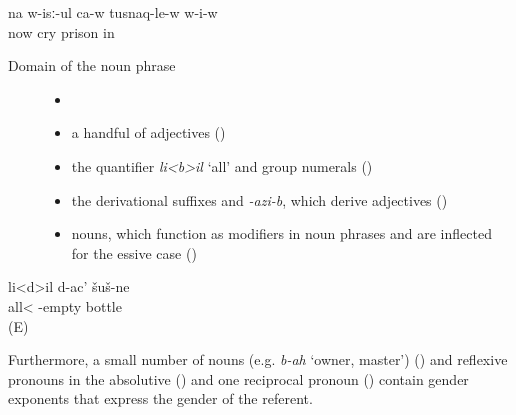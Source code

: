 \begin{exe}
	\ex	\label{ex:‎Now he is crying in prisonAGREE}
	\gll	na	w-isː-ul	ca-w	tusnaq-le-w	w-i-w\\
		now	cry		prison	in\\
	\glt	{}
\end{exe}


\begin{description}
\item[Domain of the noun phrase]
\begin{itemize}[leftmargin=*]
    \item[]
    \item	a handful of adjectives ()
	\item	the quantifier \textit{li<b>il} ‘all' and group numerals ()
	\item	the derivational suffixes  and \textit{-azi-b}, which derive adjectives ()
	\item	nouns, which function as modifiers in noun phrases and are inflected for the essive case ()
\end{itemize}
\end{description}


\begin{exe}
	\ex	\label{ex:All empty bottlesAGREE}
	\gll	li<d>il d-ac' šuš-ne\\
		all<\tsc{npl} 	-empty	bottle\\
	\glt	{} (E)
\end{exe}



Furthermore, a small number of nouns (e.g. \textit{b-ah} ‘owner, master') () and reflexive pronouns in the absolutive () and one reciprocal pronoun () contain gender exponents that express the gender of the referent.

